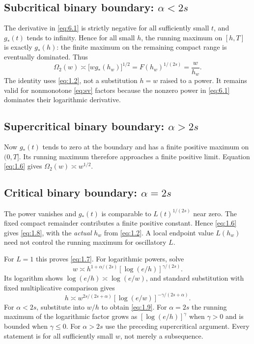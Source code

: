 \subsection*{Subcritical binary boundary: $\alpha<2s$}

The derivative in \eqref{eq:6.1} is strictly negative for all sufficiently small $t$, and $g_*(t)$ tends to infinity. Hence for all small $h$, the running maximum on $[h,T]$ is exactly $g_*(h)$: the finite maximum on the remaining compact range is eventually dominated. Thus
\begin{equation}
  \Omega_2(w)\asymp\bigl[wg_*(h_w)\bigr]^{1/2}
    =F(h_w)^{1/(2s)}=\frac{w}{h_w}.
  \tag{6.2}\label{eq:6.2}
\end{equation}
The identity uses \eqref{eq:1.2}, not a substitution $h=w$ raised to a power. It remains valid for nonmonotone \eqref{eq:sv} factors because the nonzero power in \eqref{eq:6.1} dominates their logarithmic derivative.

\subsection*{Supercritical binary boundary: $\alpha>2s$}

Now $g_*(t)$ tends to zero at the boundary and has a finite positive maximum on $(0,T]$. Its running maximum therefore approaches a finite positive limit. Equation \eqref{eq:1.6} gives $\Omega_2(w)\asymp w^{1/2}$.

\subsection*{Critical binary boundary: $\alpha=2s$}

The power vanishes and $g_*(t)$ is comparable to $L(t)^{1/(2s)}$ near zero. The fixed compact remainder contributes a finite positive constant. Hence \eqref{eq:1.6} gives \eqref{eq:1.8}, with the \emph{actual} $h_w$ from \eqref{eq:1.2}. A local endpoint value $L(h_w)$ need not control the running maximum for oscillatory $L$.

For $L=1$ this proves \eqref{eq:1.7}. For logarithmic powers, solve
\[
  w\asymp h^{1+\alpha/(2s)}[\log(e/h)]^{\gamma/(2s)}.
\]
Its logarithm shows $\log(e/h)\asymp\log(e/w)$, and standard substitution with fixed multiplicative comparison gives
\[
  h\asymp w^{2s/(2s+\alpha)}[\log(e/w)]^{-\gamma/(2s+\alpha)}.
\]
For $\alpha<2s$, substitute into $w/h$ to obtain \eqref{eq:1.9}. For $\alpha=2s$ the running maximum of the logarithmic factor grows as $[\log(e/h)]^\gamma$ when $\gamma>0$ and is bounded when $\gamma\le0$. For $\alpha>2s$ use the preceding supercritical argument. Every statement is for all sufficiently small $w$, not merely a subsequence.

